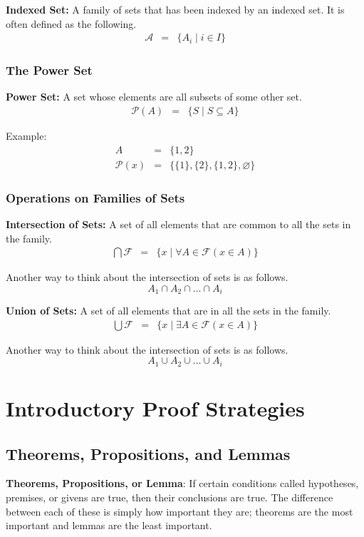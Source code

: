 \documentclass{article}
\begin{document}
\noindent \textbf{Indexed Set:} A family of sets that has been indexed by an indexed set.
It is often defined as the following.
\begin{eqnarray}
    \mathcal{A} &=& \{A_i \; | \; i \in I\}
\end{eqnarray}

\subsubsection{The Power Set}
\textbf{Power Set:} A set whose elements are all subsets of some other set.
\begin{eqnarray}
    \mathcal{P}(A) &=& \{ S \; | \; S \subseteq  A \}
\end{eqnarray}

\noindent Example:
\begin{eqnarray} \nonumber
    A &=& \{ 1, 2 \} \\ \nonumber
    \mathcal{P}(x) &=& \{ \{1\}, \{2\}, \{1, 2\}, \varnothing \}
\end{eqnarray}

\subsubsection{Operations on Families of Sets}
\textbf{Intersection of Sets:} A set of all elements that are common to all the sets
in the family.
\begin{eqnarray}
    \bigcap \mathcal{F} &=& \{ x \; | \; \forall A \in \mathcal{F}(x \in A) \}
\end{eqnarray}

\noindent Another way to think about the intersection of sets is as follows.
\[ A_1 \cap A_2 \cap ... \cap A_i \]

\noindent \textbf{Union of Sets:} A set of all elements that are in all the sets
in the family.
\begin{eqnarray}
    \bigcup \mathcal{F} &=& \{ x \; | \; \exists A \in \mathcal{F}(x \in A) \}
\end{eqnarray}

\noindent Another way to think about the intersection of sets is as follows.
\[ A_1 \cup A_2 \cup ... \cup A_i \]

\section{Introductory Proof Strategies}
\subsection{Theorems, Propositions, and Lemmas}
\textbf{Theorems, Propositions, or Lemma}: If certain conditions called hypotheses,
premises, or givens are true, then their conclusions are true. The difference between
each of these is simply how important they are; theorems are the most important and 
lemmas are the least important. \\
\end{document}
